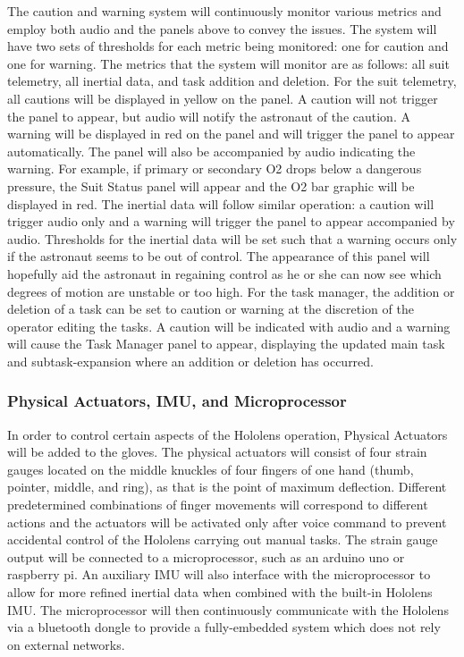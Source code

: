 \documentclass{article}
\let\Oldsubsubsection\subsubsection
\renewcommand{\subsubsection}{\FloatBarrier\Oldsubsubsection}
\begin{document}
The caution and warning system will continuously monitor various metrics 
and employ both audio and the panels above to convey the issues. The 
system will have two sets of thresholds for each metric being monitored: 
one for caution and one for warning. The metrics that the system will 
monitor are as follows:  all suit telemetry, all inertial data, and task 
addition and deletion. For the suit telemetry, all cautions will be 
displayed in yellow on the panel. A caution will not trigger the panel 
to appear, but audio will notify the astronaut of the caution. A warning 
will be displayed in red on the panel and will trigger the panel to 
appear automatically. The panel will also be accompanied by audio 
indicating the warning. For example, if primary or secondary O2 drops 
below a dangerous pressure, the Suit Status panel will appear and the O2 
bar graphic will be displayed in red. The inertial data will follow 
similar operation: a caution will trigger audio only and a warning will 
trigger the panel to appear accompanied by audio. Thresholds for the 
inertial data will be set such that a warning occurs only if the 
astronaut seems to be out of control. The appearance of this panel will 
hopefully aid the astronaut in regaining control as he or she can now 
see which degrees of motion are unstable or too high. For the task 
manager, the addition or deletion of a task can be set to caution or 
warning at the discretion of the operator editing the tasks. A caution 
will be indicated with audio and a warning will cause the Task Manager 
panel to appear, displaying the updated main task and subtask-expansion 
where an addition or deletion has occurred.

\subsubsection{Physical Actuators, IMU, and Microprocessor}

In order to control certain aspects of the Hololens operation, Physical 
Actuators will be added to the gloves. The physical actuators will 
consist of four strain gauges located on the middle knuckles of four 
fingers of one hand (thumb, pointer, middle, and ring), as that is the 
point of maximum deflection. Different predetermined combinations of 
finger movements will correspond to different actions and the actuators 
will be activated only after voice command to prevent accidental control 
of the Hololens carrying out manual tasks. The strain gauge output will 
be connected to a microprocessor, such as an arduino uno or raspberry 
pi. An auxiliary IMU will also interface with the microprocessor to 
allow for more refined inertial data when combined with the built-in 
Hololens IMU. The microprocessor will then continuously communicate with 
the Hololens via a bluetooth dongle to provide a fully-embedded system 
which does not rely on external networks.
\end{document}
